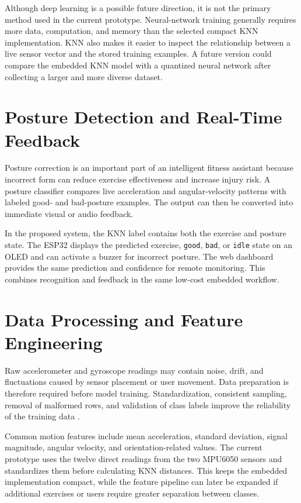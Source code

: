 Although deep learning is a possible future direction, it is not the primary method
used in the current prototype. Neural-network training generally requires more
data, computation, and memory than the selected compact KNN implementation. KNN
also makes it easier to inspect the relationship between a live sensor vector and
the stored training examples. A future version could compare the embedded KNN model
with a quantized neural network after collecting a larger and more diverse dataset.

\section{Posture Detection and Real-Time Feedback}
Posture correction is an important part of an intelligent fitness assistant because
incorrect form can reduce exercise effectiveness and increase injury risk. A posture
classifier compares live acceleration and angular-velocity patterns with labeled
good- and bad-posture examples. The output can then be converted into immediate
visual or audio feedback.

In the proposed system, the KNN label contains both the exercise and posture state.
The ESP32 displays the predicted exercise, \texttt{good}, \texttt{bad}, or
\texttt{idle} state on an OLED and can activate a buzzer for incorrect posture. The
web dashboard provides the same prediction and confidence for remote monitoring.
This combines recognition and feedback in the same low-cost embedded workflow.

\section{Data Processing and Feature Engineering}
Raw accelerometer and gyroscope readings may contain noise, drift, and fluctuations
caused by sensor placement or user movement. Data preparation is therefore required
before model training. Standardization, consistent sampling, removal of malformed
rows, and validation of class labels improve the reliability of the training data
\cite{mckinney2022python}.

Common motion features include mean acceleration, standard deviation, signal
magnitude, angular velocity, and orientation-related values. The current prototype
uses the twelve direct readings from the two MPU6050 sensors and standardizes them
before calculating KNN distances. This keeps the embedded implementation compact,
while the feature pipeline can later be expanded if additional exercises or users
require greater separation between classes.

